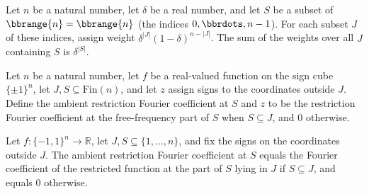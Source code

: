 \begin{theorem}
\label{FABL.sum_deltaRandomSubsetWeight_supset}
\leanok
{}
Let $n$ be a natural number, let $\delta$ be a real number, and let $S$ be a subset of
$\bbrange{n}=\bbrange{n}$ (the indices $0,\bbrdots,n-1$). For each subset $J$ of these
indices, assign weight $\delta^{|J|}(1-\delta)^{n-|J|}$. The sum of the weights over all $J$
containing $S$ is $\delta^{|S|}$.
\end{theorem}

\begin{definition}
\label{FABL.ambientRestrictionFourierCoeff}
\leanok
{}
Let $n$ be a natural number, let $f$ be a real-valued function on the sign cube
$\{\pm1\}^n$, let $J,S\subseteq\mathrm{Fin}(n)$, and let $z$ assign signs to the
coordinates outside $J$. Define the ambient restriction Fourier coefficient at $S$ and
$z$ to be the restriction Fourier coefficient at the free-frequency part of $S$ when
$S\subseteq J$, and $0$ otherwise.
\end{definition}

\begin{theorem}
\label{FABL.ambientRestrictionFourierCoeff_eq}
\leanok
{}
Let $f:\{-1,1\}^n\to\mathbb R$, let $J,S\subseteq\{1,\ldots,n\}$, and fix the signs on
the coordinates outside $J$. The ambient restriction Fourier coefficient at $S$ equals
the Fourier coefficient of the restricted function at the part of $S$ lying in $J$ if
$S\subseteq J$, and equals $0$ otherwise.
\end{theorem}

